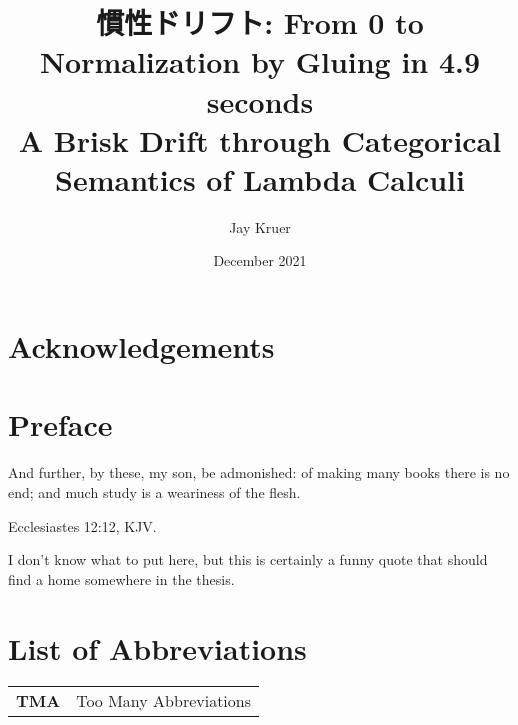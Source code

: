 \documentclass[12pt,twoside]{reedthesis}
\title{慣性ドリフト: From 0 to Normalization by Gluing in 4.9 seconds\\ A Brisk Drift through Categorical Semantics of Lambda Calculi}
\author{Jay Kruer}
\date{December 2021}
\theoremstyle{definition}
\theoremstyle{remark}
\theoremstyle{plain}
\begin{document}
\maketitle
\frontmatter %
\pagestyle{empty} %

\chapter*{Acknowledgements}



\chapter*{Preface}
\epigraph{And further, by these, my son, be admonished: of making many books
  there is no end; and much study is a weariness of the flesh.}{Ecclesiastes
  12:12, KJV.}

I don't know what to put here, but this is certainly a funny quote that should
find a home somewhere in the thesis.

\chapter*{List of Abbreviations}
\begin{table}[h]
  \centering %
  \begin{tabular}{ll}
    \textbf{TMA}  	&  Too Many Abbreviations
  \end{tabular}
\end{table}
\end{document}
